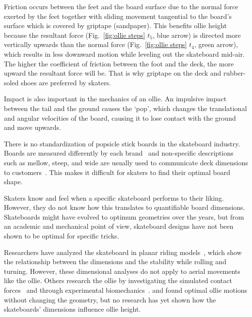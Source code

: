 \documentclass[default,iicol]{sn-jnl}
\begin{document}
Friction occurs between the feet and the board surface due to the normal force exerted by the feet together with sliding movement tangential to the board's surface which is covered by griptape (sandpaper).
This benefits ollie height because the resultant force (Fig.~\ref{fig:ollie steps} $t_5$, blue arrow) is directed more vertically upwards than the normal force (Fig.~\ref{fig:ollie steps} $t_4$, green arrow), which results in less downward motion while leveling out the skateboard mid-air.
The higher the coefficient of friction between the foot and the deck, the more upward the resultant force will be.
That is why griptape on the deck and rubber-soled shoes are preferred by skaters.

Impact is also important in the mechanics of an ollie.
An impulsive impact between the tail and the ground causes the `pop', which changes the translational and angular velocities of the board, causing it to lose contact with the ground and move upwards.

There is no standardization of popsicle stick boards in the skateboard industry.
Boards are measured differently by each brand~\cite{johnny_skateboarding_2013} and non-specific descriptions such as mellow, steep, and wide are usually used to communicate deck dimensions to customers~\cite{berger_handmade_2021}.
This makes it difficult for skaters to find their optimal board shape.

Skaters know and feel when a specific skateboard performs to their liking.
However, they do not know how this translates to quantifiable board dimensions.
Skateboards might have evolved to optimum geometries over the years, but from an academic and mechanical point of view, skateboard designs have not been shown to be optimal for specific tricks.

Researchers have analyzed the skateboard in planar riding models~\cite{hubbard_lateral_1979,kremnev_nonlinear_2010,varszegi_stability_2017}, which show the relationship between the dimensions and the stability while rolling and turning. 
However, these dimensional analyses do not apply to aerial movements like the ollie.
Others research the ollie by investigating the simulated contact forces~\cite{anderson_ollie_2020,shield_contact-implicit_2022} and through experimental biomechanics~\cite{frederick_biomechanics_2006,vorlicek_analysis_2015,wood_3d_2020,candotti_lower_2012,dias_using_2016}.
\citet{shield_contact-implicit_2022} and \citet{anderson_ollie_2020} found optimal ollie motions without changing the geometry, but no research has yet shown how the skateboards' dimensions influence ollie height.
\end{document}

